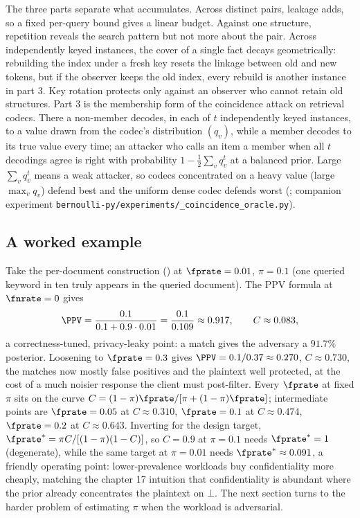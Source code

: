The three parts separate what accumulates. Across distinct pairs,
leakage adds, so a fixed per-query bound gives a linear budget. Against
one structure, repetition reveals the search pattern but not more about
the pair. Across independently keyed instances, the cover of a single
fact decays geometrically: rebuilding the index under a fresh key resets
the linkage between old and new tokens, but if the observer keeps the old
index, every rebuild is another instance in part 3. Key rotation
protects only against an observer who cannot retain old structures.
Part 3 is the membership form of the coincidence attack on retrieval
codecs. There a non-member decodes, in each of $t$ independently keyed
instances, to a value drawn from the codec's distribution $(q_v)$, while
a member decodes to its true value every time; an attacker who calls an
item a member when all $t$ decodings agree is right with probability
$1 - \tfrac12 \sum_v q_v^t$ at a balanced prior. Large $\sum_v q_v^t$
means a weak attacker, so codecs concentrated on a heavy value (large
$\max_v q_v$) defend best and the uniform dense codec defends worst
(\textcite{towell-cipher-maps}; companion experiment
\texttt{bernoulli-py/\allowbreak experiments/\_coincidence\_oracle.py}).

\subsection*{A worked example}

Take the per-document construction () at
$\fprate = 0.01$, $\pi = 0.1$ (one queried keyword in ten truly appears in
the queried document). The PPV formula at $\fnrate = 0$ gives
\[
  \PPV = \frac{0.1}{0.1 + 0.9 \cdot 0.01} = \frac{0.1}{0.109}
  \approx 0.917, \qquad C \approx 0.083,
\]
a correctness-tuned, privacy-leaky point: a match gives the adversary a
$91.7\%$ posterior. Loosening to $\fprate = 0.3$ gives $\PPV = 0.1/0.37
\approx 0.270$, $C \approx 0.730$, the matches now mostly false positives
and the plaintext well protected, at the cost of a much noisier response
the client must post-filter. Every $\fprate$ at fixed $\pi$ sits on the
curve $C = (1 - \pi)\fprate / [\pi + (1 - \pi)\fprate]$; intermediate
points are $\fprate = 0.05$ at $C \approx 0.310$, $\fprate = 0.1$ at $C
\approx 0.474$, $\fprate = 0.2$ at $C \approx 0.643$. Inverting for the
design target, $\fprate^* = \pi C / [(1 - \pi)(1 - C)]$, so $C = 0.9$ at
$\pi = 0.1$ needs $\fprate^* = 1$ (degenerate), while the same target at
$\pi = 0.01$ needs $\fprate^* \approx 0.091$, a friendly operating point:
lower-prevalence workloads buy confidentiality more cheaply, matching the
chapter 17 intuition that confidentiality is abundant where the prior
already concentrates the plaintext on $\bot$. The next section turns to
the harder problem of estimating $\pi$ when the workload is adversarial.
